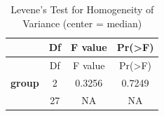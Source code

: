 \documentclass[]{article}
\begin{document}
\begin{longtable}[]{@{}cccc@{}}
\caption{Levene's Test for Homogeneity of Variance (center =
median)}\tabularnewline
\toprule
\begin{minipage}[b]{0.15\columnwidth}\centering\strut
~\strut
\end{minipage} & \begin{minipage}[b]{0.06\columnwidth}\centering\strut
Df\strut
\end{minipage} & \begin{minipage}[b]{0.12\columnwidth}\centering\strut
F value\strut
\end{minipage} & \begin{minipage}[b]{0.12\columnwidth}\centering\strut
Pr(\textgreater{}F)\strut
\end{minipage}\tabularnewline
\midrule
\endfirsthead
\toprule
\begin{minipage}[b]{0.15\columnwidth}\centering\strut
~\strut
\end{minipage} & \begin{minipage}[b]{0.06\columnwidth}\centering\strut
Df\strut
\end{minipage} & \begin{minipage}[b]{0.12\columnwidth}\centering\strut
F value\strut
\end{minipage} & \begin{minipage}[b]{0.12\columnwidth}\centering\strut
Pr(\textgreater{}F)\strut
\end{minipage}\tabularnewline
\midrule
\endhead
\begin{minipage}[t]{0.15\columnwidth}\centering\strut
\textbf{group}\strut
\end{minipage} & \begin{minipage}[t]{0.06\columnwidth}\centering\strut
2\strut
\end{minipage} & \begin{minipage}[t]{0.12\columnwidth}\centering\strut
0.3256\strut
\end{minipage} & \begin{minipage}[t]{0.12\columnwidth}\centering\strut
0.7249\strut
\end{minipage}\tabularnewline
\begin{minipage}[t]{0.15\columnwidth}\centering\strut
\strut
\end{minipage} & \begin{minipage}[t]{0.06\columnwidth}\centering\strut
27\strut
\end{minipage} & \begin{minipage}[t]{0.12\columnwidth}\centering\strut
NA\strut
\end{minipage} & \begin{minipage}[t]{0.12\columnwidth}\centering\strut
NA\strut
\end{minipage}\tabularnewline
\bottomrule
\end{longtable}
\end{document}
